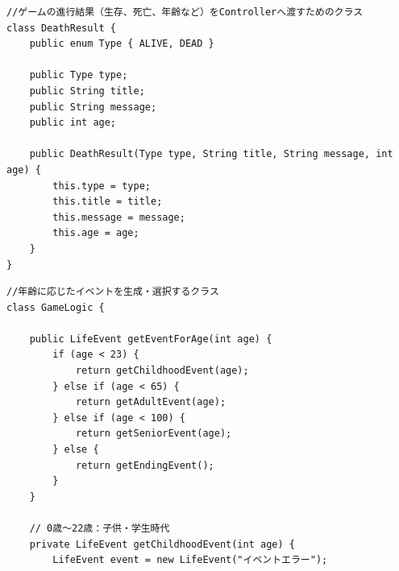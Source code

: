 \documentclass[a4paper,11pt]{jsarticle}
\begin{document}
\begin{lstlisting}[caption=DeathResult.java]
//ゲームの進行結果（生存、死亡、年齢など）をControllerへ渡すためのクラス
class DeathResult {
    public enum Type { ALIVE, DEAD }
    
    public Type type;
    public String title;
    public String message;
    public int age;

    public DeathResult(Type type, String title, String message, int age) {
        this.type = type;
        this.title = title;
        this.message = message;
        this.age = age;
    }
}
\end{lstlisting}

\begin{lstlisting}[caption=GameLogic.java]
//年齢に応じたイベントを生成・選択するクラス
class GameLogic {

    public LifeEvent getEventForAge(int age) {
        if (age < 23) {
            return getChildhoodEvent(age);
        } else if (age < 65) {
            return getAdultEvent(age);
        } else if (age < 100) {
            return getSeniorEvent(age);
        } else {
            return getEndingEvent();
        }
    }

    // 0歳〜22歳：子供・学生時代
    private LifeEvent getChildhoodEvent(int age) {
        LifeEvent event = new LifeEvent("イベントエラー");


\end{lstlisting}
\end{document}
